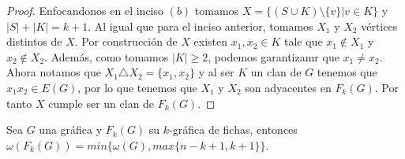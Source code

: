 \begin{proof}
        Enfocandonos en el inciso $(b)$ tomamos $X = \{(S\cup K) \setminus
        \{v\}| v \in K \}$ y $|S| + |K| = k+1$. Al igual que para el inciso
        anterior, tomamos $X_1$ y $X_2$ v\'ertices distintos de $X$. Por
        construcci\'on de $X$ existen $x_1, x_2 \in K$ tale que $x_1 \notin X_1$
        y $x_2 \notin X_2$. Adem\'as, como tomamos $|K| \geq 2$, podemos
        garantizamr que $x_1 \neq x_2$. Ahora notamos que $X_1 \triangle X_2 =
        \{x_1, x_2\}$ y al ser $K$ un clan de $G$ tenemos que $x_1x_2 \in E(G)$,
        por lo que tenemos que $X_1$ y $X_2$ son adyacentes en $F_k(G)$. Por
        tanto $X$ cumple ser un clan de $F_k(G)$.
    \end{proof}

    \begin{teorema}
        \label{teo:quinto}
        Sea $G$ una gr\'afica y $F_k(G)$ su $k$-gr\'afica de fichas, entonces
        $\omega(F_k(G))= min \{\omega(G), max \{n-k+1,k+1\}\}$.
    \end{teorema}

